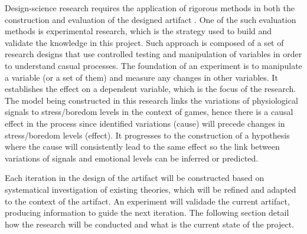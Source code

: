 
Design-science research requires the application of rigorous methods in both the construction and evaluation of the designed artifact \parencite{hevner2004design}. One of the such evaluation methods is experimental research, which is the strategy used to build and validate the knowledge in this project. Such approach is composed of a set of research designs that use controlled testing and manipulation of variables in order to understand casual processes. The foundation of an experiment is to manipulate a variable (or a set of them) and measure any changes in other variables. It establishes the effect on a dependent variable, which is the focus of the research. The model being constructed in this research links the variations of physiological signals to stress/boredom levels in the context of games, hence there is a causal effect in the process since identified variations (cause) will precede changes in stress/boredom levels (effect). It progresses to the construction of a hypothesis where the cause will consistently lead to the same effect so the link between variations of signals and emotional levels can be inferred or predicted.

Each iteration in the design of the artifact will be constructed based on systematical investigation of existing theories, which will be refined and adapted to the context of the artifact. An experiment will validade the current artifact, producing information to guide the next iteration. The following section detail how the research will be conducted and what is the current state of the project.

